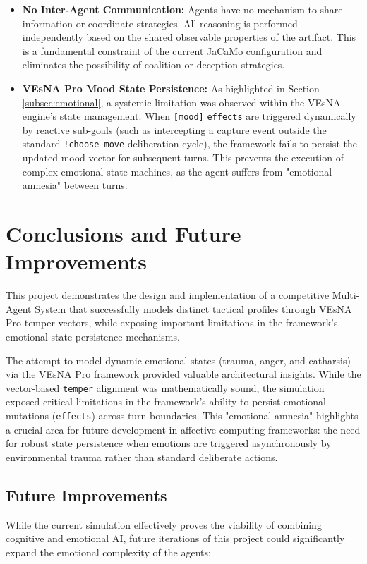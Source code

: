 \documentclass[12pt]{article}
\begin{document}
\begin{itemize}
   \item \textbf{No Inter-Agent Communication:} Agents have no mechanism to
    share information or coordinate strategies. All reasoning is performed
    independently based on the shared observable properties of the artifact.
    This is a fundamental constraint of the current JaCaMo configuration and
    eliminates the possibility of coalition or deception strategies.

   \item \textbf{VEsNA Pro Mood State Persistence:} As highlighted in Section \ref{subsec:emotional}, a systemic limitation was observed within the VEsNA engine's state management.
   When \texttt{[mood]} \texttt{effects} are triggered dynamically by reactive sub-goals (such as intercepting a capture event outside the standard \texttt{!choose\_move} deliberation cycle), the framework fails to persist the updated mood vector for subsequent turns.
   This prevents the execution of complex emotional state machines, as the agent suffers from "emotional amnesia" between turns.
\end{itemize}

\section{Conclusions and Future Improvements}
\label{sec:conclusions}
\noindent This project demonstrates the design and implementation 
of a competitive Multi-Agent System that successfully models 
distinct tactical profiles through VEsNA Pro temper vectors, 
while exposing important limitations in the framework's emotional 
state persistence mechanisms.

\noindent The attempt to model dynamic emotional states (trauma, anger, and catharsis) via the VEsNA Pro framework provided valuable architectural insights. While the vector-based \texttt{temper} alignment was mathematically sound, the simulation exposed critical limitations in the framework's ability to persist emotional mutations (\texttt{effects}) across turn boundaries. This "emotional amnesia" highlights a crucial area for future development in affective computing frameworks: the need for robust state persistence when emotions are triggered asynchronously by environmental trauma rather than standard deliberate actions.

\subsection{Future Improvements}
\label{subsec:future_improvements}
\noindent While the current simulation effectively proves the viability of combining cognitive and emotional AI, future iterations of this project could significantly expand the emotional complexity of the agents:
\end{document}
